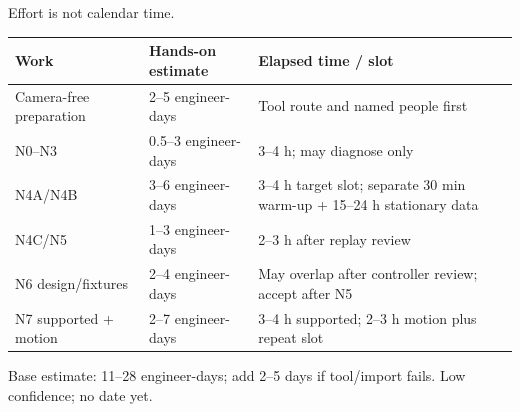 \begin{frame}{Effort is not calendar time.}
\small\renewcommand{\arraystretch}{1.25}
\begin{tabular}{@{}L{45mm}L{57mm}L{79mm}@{}}\toprule
\textbf{Work} & \textbf{Hands-on estimate} & \textbf{Elapsed time / slot}\\\midrule
Camera-free preparation & 2--5 engineer-days & Tool route and named people first\\
N0--N3 & 0.5--3 engineer-days & 3--4 h; may diagnose only\\
N4A/N4B & 3--6 engineer-days & 3--4 h target slot; separate 30 min warm-up + 15--24 h stationary data\\
N4C/N5 & 1--3 engineer-days & 2--3 h after replay review\\
N6 design/fixtures & 2--4 engineer-days & May overlap after controller review; accept after N5\\
N7 supported + motion & 2--7 engineer-days & 3--4 h supported; 2--3 h motion plus repeat slot\\\bottomrule
\end{tabular}
\par\medskip\normalsize Base estimate: 11--28 engineer-days; add 2--5 days if tool/import fails. Low confidence; no date yet.
\vfill{}
\end{frame}

